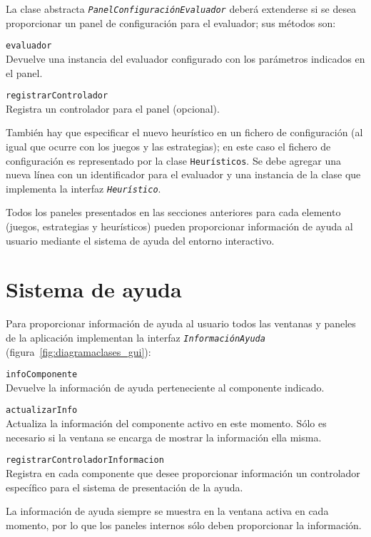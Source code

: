 La clase abstracta \texttt{\textit{PanelConfiguraciónEvaluador}} deberá extenderse si se desea proporcionar un panel de configuración para el evaluador; sus métodos son:
\begin{description}
	\item \texttt{evaluador} \\
	Devuelve una instancia del evaluador configurado con los parámetros indicados en el panel.
	\item \texttt{registrarControlador} \\
	Registra un controlador para el panel (opcional).
\end{description}

\bigskip
También hay que especificar el nuevo heurístico en un fichero de configuración (al igual que ocurre con los juegos y las estrategias); en este caso el fichero de configuración es representado por la clase \texttt{Heurísticos}.
Se debe agregar una nueva línea con un identificador para el evaluador y una instancia de la clase que implementa la interfaz \texttt{\textit{Heurístico}}.

\bigskip
Todos los paneles presentados en las secciones anteriores para cada elemento (juegos, estrategias y heurísticos) pueden proporcionar información de ayuda al usuario mediante el sistema de ayuda del entorno interactivo.

\section{Sistema de ayuda}
\label{sec:sistema_ayuda}
Para proporcionar información de ayuda al usuario todos las ventanas y paneles de la aplicación implementan la interfaz \texttt{\textit{InformaciónAyuda}} (figura~\ref{fig:diagramaclases_gui}):
\begin{description}
	\item \texttt{infoComponente} \\
	Devuelve la información de ayuda perteneciente al componente indicado.
	\item \texttt{actualizarInfo} \\
	Actualiza la información del componente activo en este momento. Sólo es necesario si la ventana se encarga de mostrar la información ella misma.
	\item \texttt{registrarControladorInformacion} \\
	Registra en cada componente que desee proporcionar información un controlador específico para el sistema de presentación de la ayuda.
\end{description}

La información de ayuda siempre se muestra en la ventana activa en cada momento, por lo que los paneles internos sólo deben proporcionar la información.